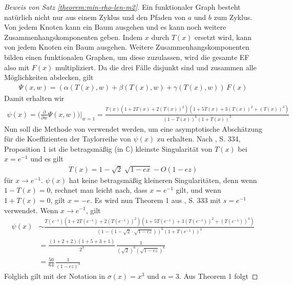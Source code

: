 \documentclass[a4paper, 10pt, ngerman]{article}
\newcommand{\C}{\mathbb{C}}
\begin{document}
\begin{proof}[Beweis von Satz \ref{theorem:min-rho-len-m2}]
        Ein funktionaler Graph besteht natürlich nicht nur aus einem Zyklus und den Pfaden von $a$ und $b$ zum Zyklus. Von jedem Knoten kann ein Baum ausgehen und es kann noch weitere Zusammenhangskomponenten geben. Indem $x$ durch $T(x)$ ersetzt wird, kann von jedem Knoten ein Baum ausgehen. Weitere Zusammenhangskomponenten bilden einen funktionalen Graphen, um diese zuzulassen, wird die gesamte EF also mit $F(x)$ multipliziert. Da die drei Fälle disjunkt sind und zusammen alle Möglichkeiten abdecken, gilt
        \begin{align*}
            \Psi(x, w)
            = (\alpha(T(x), w) + \beta(T(x), w) + \gamma(T(x), w)) \,F(x)
        \end{align*}
        Damit erhalten wir
        \begin{align*}
            \psi(x) = \Bigg (\frac {\partial} {\partial w}
            \Psi(x, w) \Bigg ) \Bigg \vert_{w = 1}
            = \frac
            {T(x)(1 + 2T(x) + 2(T(x))^2)(1 + 5T(x) + 3(T(x))^2 + (T(x))^3)}
            {(1 - T(x))^6(1 + T(x))^3}
        \end{align*}
        Nun soll die Methode von \cite{fo90} verwendet werden, um eine asymptotische Abschätzung für die Koeffizienten der Taylorreihe von $\psi(x)$ zu erhalten. Nach \cite{fo90}, S. 334, Proposition 1 ist die betragsmäßig (in $\C$) kleinste Singularität von $T(x)$ bei $x = e^{-1}$ und es gilt
        \begin{align*}
            T(x) = 1 - \sqrt{2} \; \sqrt {1 - ex} - O(1 - ez)
        \end{align*}
        für $x \to e^{-1}$. $\psi(x)$ hat keine betragsmäßig kleineren Singularitäten, denn wenn $1 - T(x) = 0$, rechnet man leicht nach, dass $x = e^{-1}$ gilt, und wenn $1 + T(x) = 0$, gilt $x = -e$. Es wird nun Theorem 1 aus \cite{fo90}, S. 333 mit $s = e^{-1}$ verwendet. Wenn $x \to e^{-1}$, gilt
        \begin{align*}
            \psi(x)
             & \sim \frac {T(e^{-1})(1 + 2T(e^{-1})
                + 2(T(e^{-1}))^2)(1 + 5T(e^{-1}) + 3(T(e^{-1}))^2 + (T(e^{-1}))^3)}
            {(1 - (1 - \sqrt 2 \cdot \sqrt {1 - ez}))^6(1 + T(e^{-1}))^3} \\
             & = \frac {(1 + 2 + 2)(1 + 5 + 3 + 1)} {2^3} \,
            \frac 1 {(\sqrt 2 )^6 (\sqrt{1 - ez})^6}                      \\
             & = \frac {50} {64} \, \frac 1 {(1 - ez)^3}
        \end{align*}
        Folglich gilt mit der Notation in \cite{fo90} $\sigma(x) = x^3$ und $\alpha = 3$. Aus Theorem 1 folgt

\end{proof}
\end{document}
